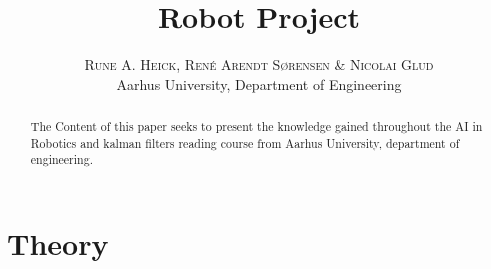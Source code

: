 


\title{\vspace{-15mm}\fontsize{24pt}{10pt}\selectfont\textbf{Robot Project}} %

\author{
\large
\textsc{Rune A. Heick, René Arendt Sørensen \& Nicolai Glud}\\[2mm] %
\normalsize Aarhus University, Department of Engineering \\ %
\vspace{-5mm}
}
\date{}



\setlength{\abovedisplayskip}{1cm}
\setlength{\belowdisplayskip}{.8cm}
\maketitle %

\newpage

\begin{abstract}
The Content of this paper seeks to present the knowledge gained throughout the AI in Robotics and kalman filters reading course from Aarhus University, department of engineering. 
\end{abstract}
\tableofcontents



\chapter{Theory}




